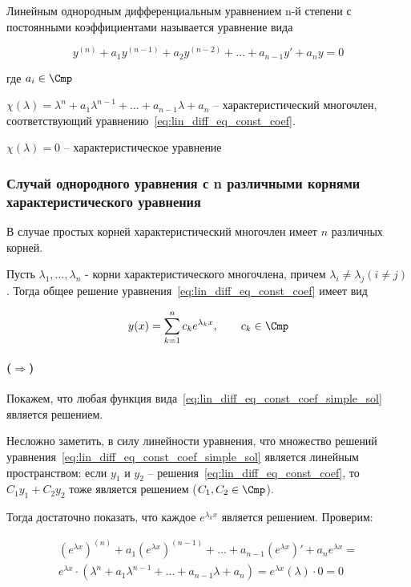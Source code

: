 \Def Линейным однородным дифференциальным уравнением n-й степени с постоянными коэффициентами называется уравнение вида

\begin{equation}
    y^{(n)} + a_1 y^{(n-1)} + a_2 y^{(n-2)} + \dots + a_{n-1} y' + a_n y = 0
    \label{eq:lin_diff_eq_const_coef}
\end{equation}

где $a_i \in \Cmp$

\Def $\chi(\lambda) = \lambda^n + a_1 \lambda^{n-1} + \dots + a_{n-1} \lambda + a_n$ -- характеристический многочлен, соответствующий уравнению~\ref{eq:lin_diff_eq_const_coef}.

\Def $\chi(\lambda) = 0$ -- характеристическое уравнение

\subsubsection{Случай однородного уравнения с n различными корнями характеристического уравнения}

В случае простых корней характеристический многочлен имеет $n$ различных корней.

\Th Пусть $\lambda_1, \dots, \lambda_n$ - корни характеристического многочлена, причем $\lambda_i \neq \lambda_j (i \neq j)$. Тогда общее решение уравнения~\ref{eq:lin_diff_eq_const_coef} имеет вид

\begin{equation}
    y(x) = \sum_{k=1}^n c_k e^{\lambda_k x},\qquad c_k \in \Cmp
    \label{eq:lin_diff_eq_const_coef_simple_sol}
\end{equation}

\Proof

\paragraph{($\Rightarrow$)} Покажем, что любая функция вида~\ref{eq:lin_diff_eq_const_coef_simple_sol} является решением.

Несложно заметить, в силу линейности уравнения, что множество решений уравнения~\ref{eq:lin_diff_eq_const_coef_simple_sol} является линейным пространством: если $y_1$ и $y_2$ -- решения~\ref{eq:lin_diff_eq_const_coef}, то $C_1 y_1 + C_2 y_2$ тоже является решением ($C_1, C_2 \in \Cmp$).

Тогда достаточно показать, что каждое $e^{\lambda_k x}$ является решением. Проверим:

\begin{align*}
\left(e^{\lambda x}\right)^{(n)} + a_1 \left(e^{\lambda x}\right)^{(n-1)} + \dots + a_{n-1} \left(e^{\lambda x}\right)' + a_n e^{\lambda x} = \\
    e^{\lambda x} \cdot (\lambda^n + a_1 \lambda^{n-1} + \dots + a_{n-1} \lambda + a_n) = e^{\lambda x} (\lambda) \cdot 0 = 0
\end{align*}

